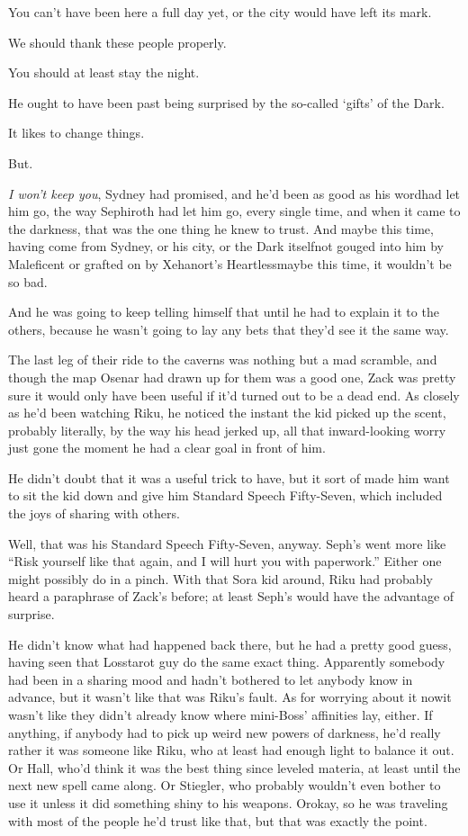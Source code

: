 You can't have been here a full day yet, or the city would have left its mark.

We should thank these people properly.

You should at least stay the night.

He ought to have been past being surprised by the so-called `gifts' of the Dark.

It likes to change things.

But.

\emph{I won't keep you}, Sydney had promised, and he'd been as good as his word\textemdash had let him go, the way Sephiroth had let him go, every single time, and when it came to the darkness, that was the one thing he knew to trust. And maybe this time, having come from Sydney, or his city, or the Dark itself\textemdash not gouged into him by Maleficent or grafted on by Xehanort's Heartless\textemdash maybe this time, it wouldn't be so bad.

And he was going to keep telling himself that until he had to explain it to the others, because he wasn't going to lay any bets that they'd see it the same way.


\scenechange


The last leg of their ride to the caverns was nothing but a mad scramble, and though the map Osenar had drawn up for them was a good one, Zack was pretty sure it would only have been useful if it'd turned out to be a dead end. As closely as he'd been watching Riku, he noticed the instant the kid picked up the scent, probably literally, by the way his head jerked up, all that inward-looking worry just gone the moment he had a clear goal in front of him.

He didn't doubt that it was a useful trick to have, but it sort of made him want to sit the kid down and give him Standard Speech Fifty-Seven, which included the joys of sharing with others.

Well, that was his Standard Speech Fifty-Seven, anyway. Seph's went more like ``Risk yourself like that again, and I will hurt you with paperwork.'' Either one might possibly do in a pinch. With that Sora kid around, Riku had probably heard a paraphrase of Zack's before; at least Seph's would have the advantage of surprise.

He didn't know what had happened back there, but he had a pretty good guess, having seen that Losstarot guy do the same exact thing. Apparently somebody had been in a sharing mood and hadn't bothered to let anybody know in advance, but it wasn't like that was Riku's fault. As for worrying about it now\textemdash it wasn't like they didn't already know where mini-Boss' affinities lay, either. If anything, if anybody had to pick up weird new powers of darkness, he'd really rather it was someone like Riku, who at least had enough light to balance it out. Or Hall, who'd think it was the best thing since leveled materia, at least until the next new spell came along. Or Stiegler, who probably wouldn't even bother to use it unless it did something shiny to his weapons. Or\textemdash okay, so he was traveling with most of the people he'd trust like that, but that was exactly the point.

